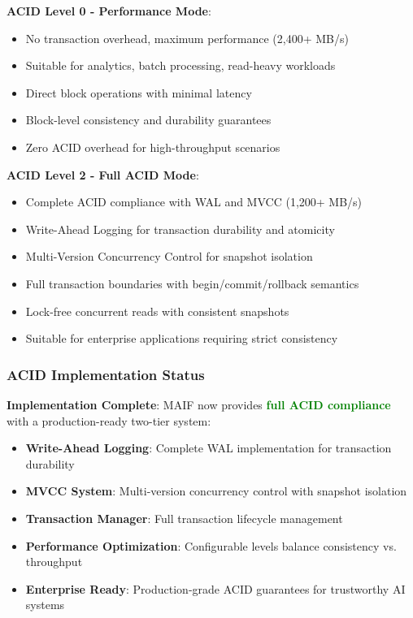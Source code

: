 \documentclass[conference]{IEEEtran}
\begin{document}
\begin{itemize}[leftmargin=*]
\textbf{ACID Level 0 - Performance Mode}:
\begin{itemize}[leftmargin=*]
\item No transaction overhead, maximum performance (2,400+ MB/s)
\item Suitable for analytics, batch processing, read-heavy workloads
\item Direct block operations with minimal latency
\item Block-level consistency and durability guarantees
\item Zero ACID overhead for high-throughput scenarios
\end{itemize}

\textbf{ACID Level 2 - Full ACID Mode}:
\begin{itemize}[leftmargin=*]
\item Complete ACID compliance with WAL and MVCC (1,200+ MB/s)
\item Write-Ahead Logging for transaction durability and atomicity
\item Multi-Version Concurrency Control for snapshot isolation
\item Full transaction boundaries with begin/commit/rollback semantics
\item Lock-free concurrent reads with consistent snapshots
\item Suitable for enterprise applications requiring strict consistency
\end{itemize}

\subsubsection{ACID Implementation Status}

\textbf{Implementation Complete}: MAIF now provides \textcolor{green}{\textbf{full ACID compliance}} with a production-ready two-tier system:

\begin{itemize}[leftmargin=*]
\item \textbf{Write-Ahead Logging}: Complete WAL implementation for transaction durability
\item \textbf{MVCC System}: Multi-version concurrency control with snapshot isolation
\item \textbf{Transaction Manager}: Full transaction lifecycle management
\item \textbf{Performance Optimization}: Configurable levels balance consistency vs. throughput
\item \textbf{Enterprise Ready}: Production-grade ACID guarantees for trustworthy AI systems
\end{itemize}


\end{itemize}
\end{document}
